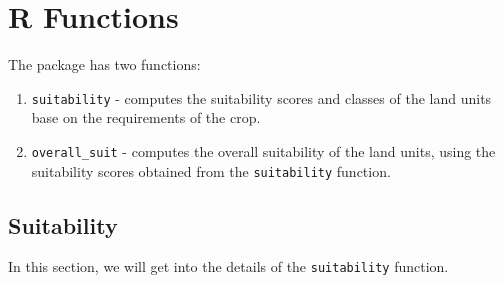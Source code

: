 \documentclass[11pt,fleqn]{article}\usepackage[]{graphicx}\usepackage[]{color}
\begin{document}
\section{R Functions}
The package has two functions:
\begin{enumerate}
\item \verb|suitability| - computes the suitability scores and classes of the land units base on the requirements of the crop.
\item \verb|overall_suit| - computes the overall suitability of the land units, using the suitability scores obtained from the \verb|suitability| function.
\end{enumerate}
\subsection{Suitability}
In this section, we will get into the details of the \verb|suitability| function.
\end{document}
